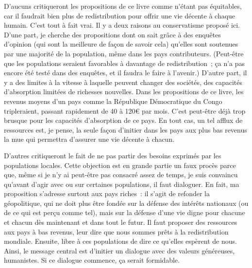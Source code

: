 \documentclass[a5paper,french]{memoir}
\begin{document}
D'aucuns critiqueront les propositions de ce livre comme n'étant pas équitables, car il faudrait bien plus de redistribution pour offrir une vie décente à chaque humain. C'est tout à fait vrai. Il y a deux raisons au conservatisme proposé ici. D'une part, je cherche des propositions dont on sait grâce à des enquêtes d'opinion (qui sont la meilleure de façon de savoir cela) qu'elles sont soutenues par une majorité de la population, même dans les pays contributeurs. (Peut-être que les populations seraient favorables à davantage de redistribution~; ça n'a pas encore été testé dans des enquêtes, et il faudra le faire à l'avenir.) D'autre part, il y a des limites à la vitesse à laquelle peuvent changer des sociétés, des capacités d'absorption limitées de richesses nouvelles. Dans les propositions de ce livre, les revenus moyens d'un pays comme la République Démocratique du Congo tripleraient, passant rapidement de 40 à 120\euro{} par mois. C'est peut-être déjà trop brusque pour les capacités d'absorption de ce pays. En tout cas, un tel afflux de ressources est, je pense, la seule façon d'initier dans les pays aux plus bas revenus la mue qui permettra d'assurer une vie décente à chacun. 

D'autres critiqueront le fait 
de ne pas partir des besoins exprimés par les populations locales. 
Cette objection est en grande partie un faux procès parce que, même si je n'y ai peut-être pas consacré assez de temps, je suis convaincu qu'avant d'agir avec ou sur certaines populations, il faut dialoguer. En fait, ma proposition s'adresse surtout aux pays riches~: il s'agit de refonder la géopolitique, qui ne doit plus être fondée sur la défense des intérêts nationaux (ou de ce qui est perçu comme tel), mais sur la défense d'une vie digne pour chacune et chacun dès maintenant et dans tout le futur. Il faut proposer des ressources aux pays à bas revenus, leur dire que nous sommes prêts à la redistribution mondiale. Ensuite, libre à ces populations de dire ce qu'elles espèrent de nous. 
Ainsi, le message central est d'initier un dialogue avec des valeurs généreuses, humanistes. Si ce dialogue commence, ça serait formidable. 
\end{document}

